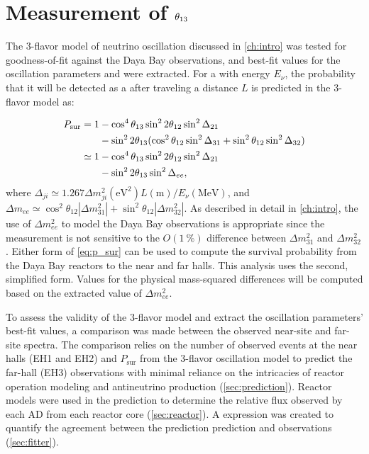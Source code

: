 \chapter{Measurement of \texorpdfstring{$\theta_{13}$}{theta13}}
\label{ch:analysis}

The 3-flavor model of neutrino oscillation discussed in \cref{ch:intro}
was tested for goodness-of-fit against the Daya Bay observations,
and best-fit values for the oscillation parameters \thetaot{} and \dmee{}
were extracted.
For a \nuebar{} with energy $E_\nu$,
the probability that it will be detected as a \nuebar{}
after traveling a distance $L$ is predicted in the 3-flavor model as:

\begin{align}\label{eq:p_sur}
    \begin{split}
        P_\text{sur} = 1 &- \cos^4\theta_{13}\sin^22\theta_{12}\sin^2\Delta_{21} \\
                         &- \sin^22\theta_{13}(\cos^2\theta_{12}\sin^2\Delta_{31}
                     + \sin^2\theta_{12}\sin^2\Delta_{32}) \\
        \simeq 1 &- \cos^4\theta_{13}\sin^22\theta_{12}\sin^2\Delta_{21} \\
                 &- \sin^22\theta_{13}\sin^2\Delta_{ee},
\end{split}
\end{align}
where
$\Delta_{ji} \simeq 1.267 \Delta m^2_{ji} (\si{\eV}^2) L(\si{\m})/E_\nu (\si{\MeV})$,
and
$\Delta m_{ee} \simeq \cos^2\theta_{12}\left|\Delta m^2_{31}\right| +
\sin^2\theta_{12}\left|\Delta m^2_{32}\right|$.
As described in detail in \cref{ch:intro},
the use of $\Delta m^2_{ee}$ to model the Daya Bay observations
is appropriate since the measurement is not sensitive
to the $O(\SI{1}{\percent})$ difference between $\Delta m^2_{31}$ and $\Delta m^2_{32}$.
Either form of \cref{eq:p_sur} can be used to compute the \nuebar{} survival probability
from the Daya Bay reactors to the near and far halls.
This analysis uses the second, simplified form.
Values for the physical mass-squared differences will be computed
based on the extracted value of $\Delta m^2_{ee}$.

To assess the validity of the 3-flavor model and extract the oscillation parameters'
best-fit values,
a comparison was made between the observed near-site and far-site \nuebar{} spectra.
The comparison relies on the number of observed events at the near halls (EH1 and EH2)
and $P_\text{sur}$ from the 3-flavor oscillation model
to predict the far-hall (EH3) observations
with minimal reliance on the intricacies of reactor operation modeling
and antineutrino production (\cref{sec:prediction}).
Reactor models were used in the prediction
to determine the relative \nuebar{} flux
observed by each AD from each reactor core (\cref{sec:reactor}).
A \chisquare{} expression was created to quantify the agreement
between the prediction prediction and observations (\cref{sec:fitter}).

